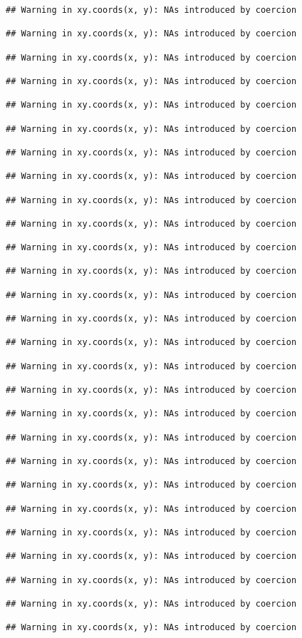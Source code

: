 \documentclass[]{article}
\begin{document}
\begin{verbatim}
## Warning in xy.coords(x, y): NAs introduced by coercion

## Warning in xy.coords(x, y): NAs introduced by coercion

## Warning in xy.coords(x, y): NAs introduced by coercion

## Warning in xy.coords(x, y): NAs introduced by coercion

## Warning in xy.coords(x, y): NAs introduced by coercion

## Warning in xy.coords(x, y): NAs introduced by coercion

## Warning in xy.coords(x, y): NAs introduced by coercion

## Warning in xy.coords(x, y): NAs introduced by coercion

## Warning in xy.coords(x, y): NAs introduced by coercion

## Warning in xy.coords(x, y): NAs introduced by coercion

## Warning in xy.coords(x, y): NAs introduced by coercion

## Warning in xy.coords(x, y): NAs introduced by coercion

## Warning in xy.coords(x, y): NAs introduced by coercion

## Warning in xy.coords(x, y): NAs introduced by coercion

## Warning in xy.coords(x, y): NAs introduced by coercion

## Warning in xy.coords(x, y): NAs introduced by coercion

## Warning in xy.coords(x, y): NAs introduced by coercion

## Warning in xy.coords(x, y): NAs introduced by coercion

## Warning in xy.coords(x, y): NAs introduced by coercion

## Warning in xy.coords(x, y): NAs introduced by coercion

## Warning in xy.coords(x, y): NAs introduced by coercion

## Warning in xy.coords(x, y): NAs introduced by coercion

## Warning in xy.coords(x, y): NAs introduced by coercion

## Warning in xy.coords(x, y): NAs introduced by coercion

## Warning in xy.coords(x, y): NAs introduced by coercion

## Warning in xy.coords(x, y): NAs introduced by coercion

## Warning in xy.coords(x, y): NAs introduced by coercion


\end{verbatim}
\end{document}
